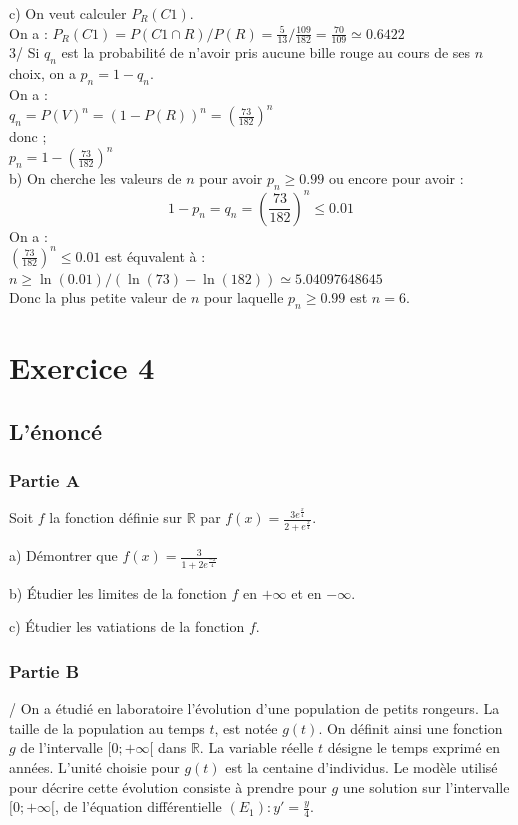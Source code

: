 \documentclass[a4paper,11pt]{book}
\begin{document}
c) On veut calculer $P_{R}(C1)$.\\
On a :  
$P_{R}(C1)= P(C1 \cap R)/P(R)=\frac{5}{13}/\frac{109}{182}=\frac{70}{109}\simeq 0.6422$\\
3/ Si $q_n$ est la probabilit\'e de n'avoir pris aucune bille rouge au cours de
ses $n$ choix, on a $p_n=1-q_n$.\\
On a :\\
$q_n=P(V)^n=(1-P(R))^n=(\frac{73}{182})^n$\\
donc ;\\
$p_n=1-(\frac{73}{182})^n$\\
b) On cherche les valeurs de $n$ pour avoir $p_n \geq 0.99$ ou encore pour
avoir :
$$1-p_n=q_n =(\frac{73}{182})^n \leq 0.01$$
On a :\\
$ (\frac{73}{182})^n \leq 0.01$ est \'equvalent \`a :\\
$n \geq \ln(0.01)/(\ln(73)-\ln(182)) \simeq 5.04097648645$\\
Donc la plus petite valeur de $n$ pour laquelle $p_n \geq 0.99$ est $n=6$.
\section{Exercice 4}
\subsection{L'\'enonc\'e}
\subsubsection{Partie A}
Soit $f$ la fonction d\'efinie sur $\mathbb R$ par 
$\displaystyle f(x)=\frac{3e^{\frac{x}{4}}}{2+e^{\frac{x}{4}}}$.

a) D\'emontrer que $\displaystyle f(x)=\frac{3}{1+2e^{\frac{-x}{4}}}$

b) \'Etudier les limites de la fonction $f$ en $+\infty$ et en $-\infty$.
 
c) \'Etudier les vatiations de la fonction $f$.
\subsubsection{Partie B}
/ On a \'etudi\'e en laboratoire l'\'evolution d'une population de petits
 rongeurs. La taille de la population au temps $t$, est not\'ee $g(t)$.
On d\'efinit ainsi une fonction $g$ de l'intervalle $[0;+\infty[$ dans
 $\mathbb R$. La variable r\'eelle $t$ d\'esigne le temps exprim\'e en ann\'ees. L'unit\'e choisie pour $g(t)$ est la centaine d'individus. Le mod\`ele utilis\'e pour d\'ecrire cette \'evolution consiste \`a prendre pour $g$ une solution
sur l'intervalle $[0;+\infty[$, de l'\'equation diff\'erentielle 
$\displaystyle (E_1) : y'=\frac{y}{4}$.
\end{document}
